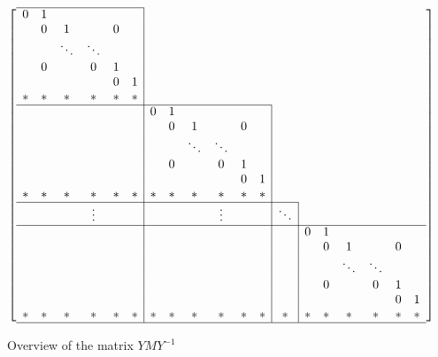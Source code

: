 \begin{figure}
\caption{Overview of the matrix $YMY^{-1}$}
\label{bigmat}
\[ \left[ \begin{array}{cccccc|cccccc|c|cccccc}
\cline{1-6}
  0 & 1 &      &      &   &   \\
    & 0 & 1    &      & 0 &   \\
    &   &\ddots&\ddots&   &   \\
    & 0 &      &   0  & 1 &   \\
    &   &      &      & 0 & 1 \\
  {}* & * &   *  &   *  & * & * \\
\cline{1-12}
  &&&&&& 0 & 1 &      &      &   &   \\
  &&&&&&  & 0 & 1    &      & 0 &   \\
  &&&&&&  &   &\ddots&\ddots&   &   \\
  &&&&&&  & 0 &      &   0  & 1 &   \\
  &&&&&&  &   &      &      & 0 & 1 \\
  {}*&*&*&*&*&*&* & * &   *  &   *  & * & * \\
\cline{1-13}
  &&&\vdots&&& &&&\vdots&&& \ddots \\
\cline{1-19}
  &&&&&& &&&&&& & 0 & 1 &      &      &   &   \\
  &&&&&& &&&&&& & & 0 & 1    &      & 0 &   \\
  &&&&&& &&&&&& & &   &\ddots&\ddots&   &   \\
  &&&&&& &&&&&& & & 0 &      &   0  & 1 &   \\
  &&&&&& &&&&&& & &   &      &      & 0 & 1 \\
  {}*&*&*&*&*&*& *&*&*&*&*&*&* &*& * &   *  &   *  & * & * \\
\hline
\end{array} \right] \]
\end{figure}

